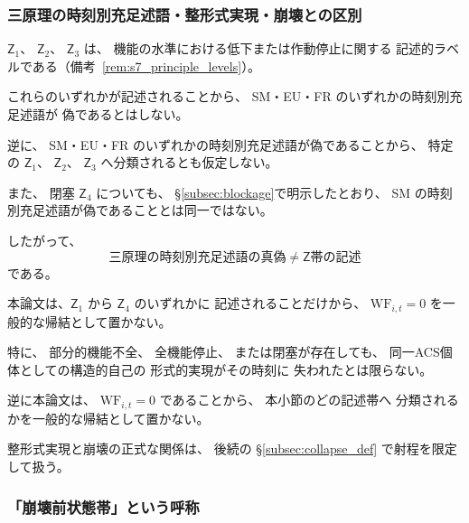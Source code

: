 \subsubsection{三原理の時刻別充足述語・整形式実現・崩壊との区別}

\begin{remark}[状態帯と三原理の時刻別充足述語が偽であることを同一視しない]
\label{rem:zones_not_principle_failure}
$\mathsf{Z}_1$、
$\mathsf{Z}_2$、
$\mathsf{Z}_3$
は、
機能の水準における低下または作動停止に関する
記述的ラベルである（備考~\ref{rem:s7_principle_levels}）。

これらのいずれかが記述されることから、
SM・EU・FR のいずれかの時刻別充足述語が
偽であるとはしない。

逆に、
SM・EU・FR のいずれかの時刻別充足述語が偽であることから、
特定の
$\mathsf{Z}_1$、
$\mathsf{Z}_2$、
$\mathsf{Z}_3$
へ分類されるとも仮定しない。

また、
閉塞
$\mathsf{Z}_4$
についても、
\S\ref{subsec:blockage}で明示したとおり、
SM の時刻別充足述語が偽であることとは同一ではない。

したがって、
\[
  \text{三原理の時刻別充足述語の真偽}
  \neq
  \text{$\mathsf{Z}$帯の記述}
\]
である。
\end{remark}

\begin{remark}[崩壊前状態帯と整形式実現の不成立を同一視しない]
\label{rem:precollapse_not_wf_failure}
本論文は、$\mathsf{Z}_1$ から
$\mathsf{Z}_4$ のいずれかに
記述されることだけから、
$\mathrm{WF}_{i,t}=0$
を一般的な帰結として置かない。

特に、
部分的機能不全、
全機能停止、
または閉塞が存在しても、
同一ACS個体としての構造的自己の
形式的実現がその時刻に
失われたとは限らない。

逆に本論文は、
$\mathrm{WF}_{i,t}=0$
であることから、
本小節のどの記述帯へ
分類されるかを一般的な帰結として置かない。

整形式実現と崩壊の正式な関係は、
後続の
\S\ref{subsec:collapse_def}
で射程を限定して扱う。
\end{remark}

\subsubsection{「崩壊前状態帯」という呼称}

